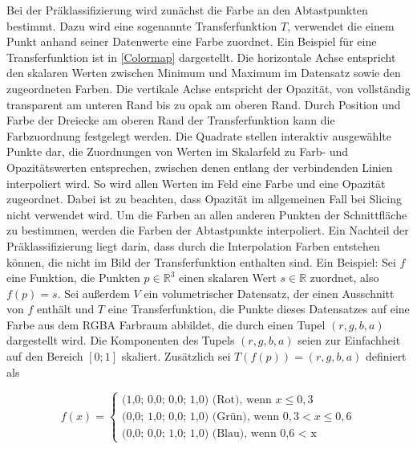 \documentclass[a4paper,fontsize=12pt,toc=bib,parskip=half,ngerman]{scrartcl}
\begin{document}
Bei der Pr\"aklassifizierung wird zun\"achst die Farbe  an den Abtastpunkten bestimmt. Dazu wird eine sogenannte \glq Transferfunktion\grq{} $T$, verwendet die einem Punkt anhand seiner Datenwerte eine Farbe zuordnet. Ein Beispiel f\"ur eine Transferfunktion ist in \cref{Colormap} dargestellt. Die horizontale Achse entspricht den skalaren Werten zwischen Minimum und Maximum im Datensatz sowie den zugeordneten Farben. Die vertikale Achse entspricht der Opazit\"at, von vollst\"andig transparent am unteren Rand bis zu opak am oberen Rand. Durch Position und Farbe der Dreiecke am oberen Rand der Transferfunktion kann die Farbzuordnung festgelegt werden. Die Quadrate stellen interaktiv ausgew\"ahlte Punkte dar, die Zuordnungen von Werten im Skalarfeld zu Farb- und Opazit\"atswerten entsprechen, zwischen denen entlang der verbindenden Linien interpoliert wird. So wird allen Werten im Feld eine Farbe und eine Opazit\"at zugeordnet. Dabei ist zu beachten, dass Opazit\"at im allgemeinen Fall bei Slicing nicht verwendet wird. Um die Farben an allen anderen Punkten der Schnittfl\"ache zu bestimmen, werden die Farben der Abtastpunkte interpoliert. Ein Nachteil der Pr\"aklassifizierung liegt darin, dass durch die Interpolation Farben entstehen k\"onnen, die nicht im Bild der Transferfunktion enthalten sind. Ein Beispiel: Sei $f$ eine Funktion, die Punkten $p \in \mathbb{R}^3$ einen skalaren Wert $s \in \mathbb{R}$ zuordnet, also $f(p) = s$. Sei au{\ss}erdem $V$ ein volumetrischer Datensatz, der einen Ausschnitt von $f$ enth\"alt und $T$ eine Transferfunktion, die Punkte dieses Datensatzes auf eine Farbe aus dem RGBA Farbraum abbildet, die durch einen Tupel $(r,g,b,a)$ dargestellt wird. Die Komponenten des Tupels $(r,g,b,a)$ seien zur Einfachheit auf den Bereich $[0;1]$ skaliert. Zus\"atzlich sei $T(f(p)) = (r,g,b,a)$ definiert als 

\begin{equation}
	f(x)= 
	\begin{cases}
		\text{(1,0; 0,0; 0,0; 1,0) (Rot), wenn } x\leq 0,3\\
		\text{(0,0; 1,0; 0,0; 1,0) (Gr\"un), wenn } 0,3 < x\leq 0,6\\
		\text{(0,0; 0,0; 1,0; 1,0) (Blau), wenn 0,6 < x}
	\end{cases}
\end{equation}
\end{document}
